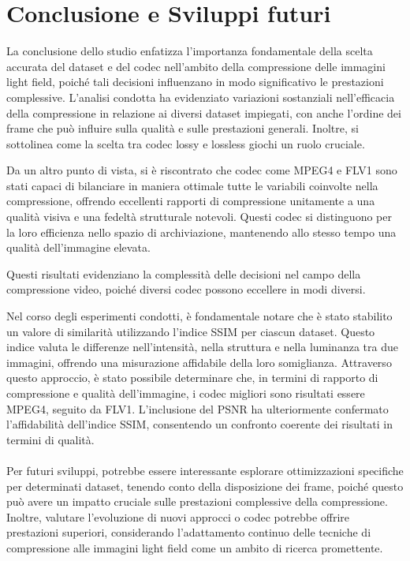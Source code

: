 \chapter{Conclusione e Sviluppi futuri}
La conclusione dello studio enfatizza l'importanza fondamentale della scelta accurata del dataset e del codec nell'ambito della compressione delle immagini light field, poiché tali decisioni influenzano in modo significativo le prestazioni complessive. L'analisi condotta ha evidenziato variazioni sostanziali nell'efficacia della compressione in relazione ai diversi dataset impiegati, con anche l'ordine dei frame che può influire sulla qualità e sulle prestazioni generali. Inoltre, si sottolinea come la scelta tra codec lossy e lossless giochi un ruolo cruciale.

Da un altro punto di vista, si è riscontrato che codec come MPEG4 e FLV1 sono stati capaci di bilanciare in maniera ottimale tutte le variabili coinvolte nella compressione, offrendo eccellenti rapporti di compressione unitamente a una qualità visiva e una fedeltà strutturale notevoli. Questi codec si distinguono per la loro efficienza nello spazio di archiviazione, mantenendo allo stesso tempo una qualità dell'immagine elevata.

Questi risultati evidenziano la complessità delle decisioni nel campo della compressione video, poiché diversi codec possono eccellere in modi diversi.

Nel corso degli esperimenti condotti, è fondamentale notare che è stato stabilito un valore di similarità utilizzando l'indice SSIM per ciascun dataset. Questo indice valuta le differenze nell'intensità, nella struttura e nella luminanza tra due immagini, offrendo una misurazione affidabile della loro somiglianza. Attraverso questo approccio, è stato possibile determinare che, in termini di rapporto di compressione e qualità dell'immagine, i codec migliori sono risultati essere MPEG4, seguito da FLV1. L'inclusione del PSNR ha ulteriormente confermato l'affidabilità dell'indice SSIM, consentendo un confronto coerente dei risultati in termini di qualità.
\\
\\
Per futuri sviluppi, potrebbe essere interessante esplorare ottimizzazioni specifiche per determinati dataset, tenendo conto della disposizione dei frame, poiché questo può avere un impatto cruciale sulle prestazioni complessive della compressione. Inoltre, valutare l'evoluzione di nuovi approcci o codec potrebbe offrire prestazioni superiori, considerando l'adattamento continuo delle tecniche di compressione alle immagini light field come un ambito di ricerca promettente.